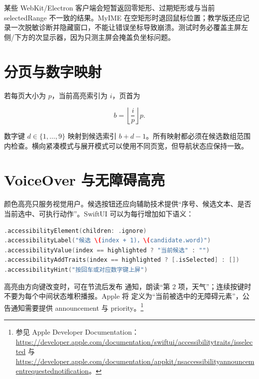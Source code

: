\begin{warningbox}
某些 WebKit/Electron 客户端会短暂返回零矩形、过期矩形或与当前 selectedRange 不一致的结果。MyIME 在空矩形时退回鼠标位置；教学版还应记录一次脱敏诊断并隐藏窗口，不能让错误坐标导致崩溃。测试时务必覆盖主屏左侧/下方的次显示器，因为只测主屏会掩盖负坐标问题。
\end{warningbox}




\section{分页与数字映射}

若每页大小为 \(p\)，当前高亮索引为 \(i\)，页首为

\[
  b=\left\lfloor\frac{i}{p}\right\rfloor p.
\]

数字键 \(d\in\{1,\ldots,9\}\) 映射到候选索引 \(b+d-1\)。所有映射都必须在候选数组范围内检查。横向紧凑模式与展开模式可以使用不同页宽，但导航状态应保持一致。

\section{VoiceOver 与无障碍高亮}

颜色高亮只服务视觉用户。候选按钮还应向辅助技术提供“序号、候选文本、是否当前选中、可执行动作”。SwiftUI 可以为每行增加如下语义：

\begin{lstlisting}[language=Swift,caption={候选按钮的 VoiceOver 语义规范}]
.accessibilityElement(children: .ignore)
.accessibilityLabel("候选 \(index + 1)，\(candidate.word)")
.accessibilityValue(index == highlighted ? "当前候选" : "")
.accessibilityAddTraits(index == highlighted ? [.isSelected] : [])
.accessibilityHint("按回车或对应数字键上屏")
\end{lstlisting}

高亮由方向键改变时，可在节流后发布  通知，朗读“第 2 项，天气”；连续按键时不要为每个中间状态堆积播报。Apple 将  定义为“当前被选中的无障碍元素”，公告通知需要提供 announcement 与 priority。\footnote{参见 Apple Developer Documentation：\url{https://developer.apple.com/documentation/swiftui/accessibilitytraits/isselected} 与 \url{https://developer.apple.com/documentation/appkit/nsaccessibilityannouncementrequestednotification}。}

